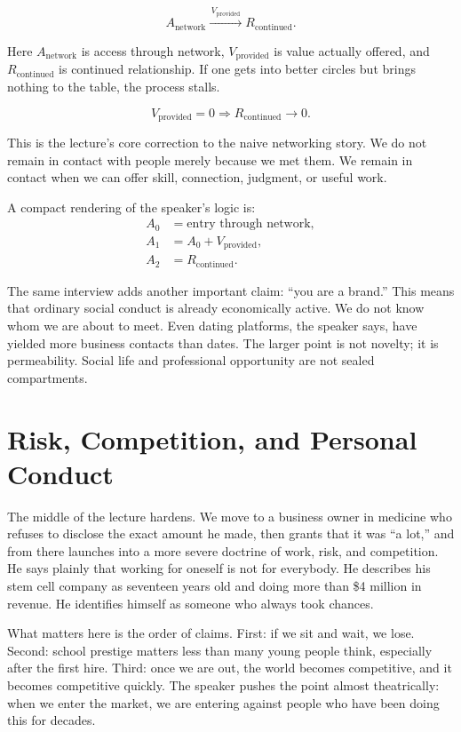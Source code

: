 \begin{equation}
A_{\mathrm{network}} \xrightarrow{\,V_{\mathrm{provided}}\,} R_{\mathrm{continued}}.
\end{equation}

Here \(A_{\mathrm{network}}\) is access through network, \(V_{\mathrm{provided}}\) is value actually offered, and \(R_{\mathrm{continued}}\) is continued relationship. If one gets into better circles but brings nothing to the table, the process stalls.

\begin{equation}
V_{\mathrm{provided}} = 0 \Rightarrow R_{\mathrm{continued}} \to 0.
\end{equation}

This is the lecture's core correction to the naive networking story. We do not remain in contact with people merely because we met them. We remain in contact when we can offer skill, connection, judgment, or useful work.

A compact rendering of the speaker's logic is:
\begin{align}
A_0 &= \text{entry through network},\\
A_1 &= A_0 + V_{\mathrm{provided}},\\
A_2 &= R_{\mathrm{continued}}.
\end{align}

The same interview adds another important claim: ``you are a brand.'' This means that ordinary social conduct is already economically active. We do not know whom we are about to meet. Even dating platforms, the speaker says, have yielded more business contacts than dates. The larger point is not novelty; it is permeability. Social life and professional opportunity are not sealed compartments.

\section{Risk, Competition, and Personal Conduct}

The middle of the lecture hardens. We move to a business owner in medicine who refuses to disclose the exact amount he made, then grants that it was ``a lot,'' and from there launches into a more severe doctrine of work, risk, and competition. He says plainly that working for oneself is not for everybody. He describes his stem cell company as seventeen years old and doing more than \$4 million in revenue. He identifies himself as someone who always took chances.

What matters here is the order of claims. First: if we sit and wait, we lose. Second: school prestige matters less than many young people think, especially after the first hire. Third: once we are out, the world becomes competitive, and it becomes competitive quickly. The speaker pushes the point almost theatrically: when we enter the market, we are entering against people who have been doing this for decades.

